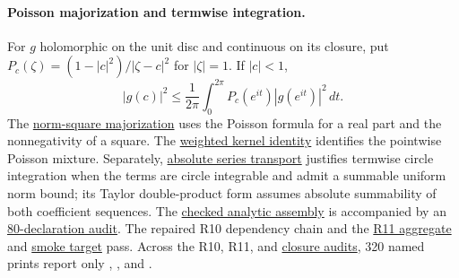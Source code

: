 \paragraph{Poisson majorization and termwise integration.}
For $g$ holomorphic on the unit disc and continuous on its closure, put
$P_c(\zeta)=(1-|c|^2)/|\zeta-c|^2$ for $|\zeta|=1$.  If $|c|<1$,
\[
 |g(c)|^2\le\frac1{2\pi}\int_0^{2\pi}
 P_c(e^{it})|g(e^{it})|^2\,dt.
\]
The \href{https://github.com/wcook04/plectis-erdos/blob/d4fed71423840f70f10edf27b9ad27c22fc4f49a/ErdosProblems/Erdos1041/PoissonNormSquare.lean#L114}{norm-square majorization}
uses the Poisson formula for a real part and the nonnegativity of a square.
The \href{https://github.com/wcook04/plectis-erdos/blob/d4fed71423840f70f10edf27b9ad27c22fc4f49a/ErdosProblems/Erdos1041/PoissonKernelBridge.lean#L27}{weighted kernel identity}
identifies the pointwise Poisson mixture.  Separately,
\href{https://github.com/wcook04/plectis-erdos/blob/d4fed71423840f70f10edf27b9ad27c22fc4f49a/ErdosProblems/Erdos1041/CircleSeriesTransport.lean#L49}{absolute series transport}
justifies termwise circle integration when the terms are circle integrable
and admit a summable uniform norm bound; its Taylor double-product form
assumes absolute summability of both coefficient sequences.
The
\href{https://github.com/wcook04/plectis-erdos/blob/3f1a5e9b284b9c3348eebd549e24c2f3972606ae/ErdosProblems/Erdos1041/PaperAnalyticR10.lean\#L1}{checked analytic assembly}
is accompanied by an
\href{https://github.com/wcook04/plectis-erdos/blob/3f1a5e9b284b9c3348eebd549e24c2f3972606ae/ErdosProblems/Erdos1041/PaperAnalyticR10Audit.lean\#L1}{80-declaration audit}.
The repaired R10 dependency chain and the
\href{https://github.com/wcook04/plectis-erdos/blob/3f1a5e9b284b9c3348eebd549e24c2f3972606ae/ErdosProblems/Erdos1041/PaperAnalyticR11.lean\#L1}{R11 aggregate}
and
\href{https://github.com/wcook04/plectis-erdos/blob/3f1a5e9b284b9c3348eebd549e24c2f3972606ae/ErdosProblems/Erdos1041/PaperAnalyticSmokeR11.lean\#L1}{smoke target}
pass. Across the R10, R11, and
\href{https://github.com/wcook04/plectis-erdos/blob/3f1a5e9b284b9c3348eebd549e24c2f3972606ae/ErdosProblems/Erdos1041/PaperAnalyticClosureAuditR11.lean\#L1}{closure audits},
320 named prints report only , , and
.

